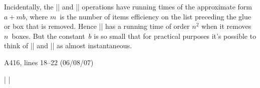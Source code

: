 Incidentally, the |\unskip| and |\lastbox| operations have running
times of the approximate form
$a+mb$, where $m$~is the number of items {efficiency} on the
list preceding the glue or box that is removed. Hence |\removehboxes| has a
running time of order $n^2$ when it removes $n$~boxes.
But the constant~$b$ is so small that
for practical purposes it's possible to think of\/ |\unskip| and
|\lastbox| as almost instantaneous.

\bugonpage A416, lines 18--22 (06/08/07)

\ninepoint\noindent\beginlines
|\def\leftheadline{\hbox to \pagewidth{\spaceskip=0pt|
|    \vbox to 10pt{}%
|    \llap{\tenbf\folio\kern1pc}%
|    \tenit\rhead\hfil}} %
|\def\rightheadline{\hbox to \pagewidth{\spaceskip=0pt\vbox to 10pt{}%
\endlines

\bugonpage A450, lines 14--16 from the bottom (12/19/02)

}}
